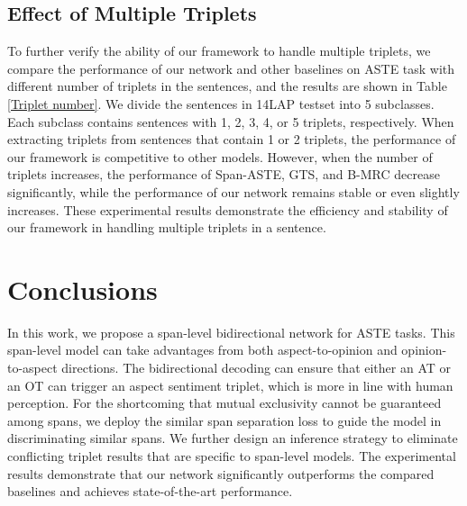 \documentclass[11pt]{article}
\begin{document}
\subsection{Effect of Multiple Triplets}

\begin{table}[htpb]
	\footnotesize
	\centering
	\caption{Effects of multiple triplets in a sentence in 14LAP (\emph{F1-score}, \%).}
	\label{Triplet number}
\end{table}

To further verify the ability of our framework to handle multiple triplets, we compare the performance of our network and other baselines on ASTE task with different number of triplets in the sentences, and the results are shown in Table \ref{Triplet number}. We divide the sentences in 14LAP testset into 5 subclasses. Each subclass contains sentences with 1, 2, 3, 4, or  5 triplets, respectively. When extracting triplets from sentences that contain 1 or 2 triplets, the performance of our framework is competitive to other models. However, when the number of triplets increases, the performance of Span-ASTE, GTS, and B-MRC decrease significantly, while the performance of our network remains stable or even slightly increases. These experimental results demonstrate the efficiency and stability of our framework in handling multiple triplets in a sentence.

\section{Conclusions}
In this work, we propose a span-level bidirectional network for ASTE tasks. This span-level model can take advantages from both aspect-to-opinion and opinion-to-aspect directions. The bidirectional decoding can ensure that either an AT or an OT can trigger an aspect sentiment triplet, which is more in line with human perception. For the shortcoming that mutual exclusivity cannot be guaranteed among spans, we deploy the similar span separation loss to guide the model in discriminating similar spans. We further design an inference strategy to eliminate conflicting triplet results that are specific to span-level models. The experimental results demonstrate that our network significantly outperforms the compared baselines and achieves state-of-the-art performance. 
\end{document}
